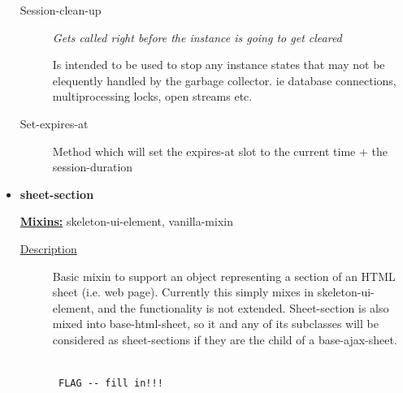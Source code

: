 \documentclass [11pt]{book}
\begin{document}
\begin{itemize}
\begin{description}
\item [Session-clean-up]
\emph{Gets called right before the instance is going to get cleared}

 Is intended to be used to stop any instance states that may not be elequently handled by the garbage collector. ie database connections, multiprocessing locks, open streams etc.




\item [Set-expires-at]

Method which will set the expires-at slot to the current time + the session-duration




\end{description}







\item {}
\label{prim:sheet-section}
\textbf{sheet-section}


\textbf{
\underline{Mixins:}} skeleton-ui-element, vanilla-mixin





\begin{description}

\item [
\underline{Description}]


Basic mixin to support an object 
representing a section of an HTML sheet (i.e. web page). Currently 
this simply mixes in skeleton-ui-element, and the functionality is not 
extended. Sheet-section is also mixed into base-html-sheet, so it and 
any of its subclasses will be considered as sheet-sections if they 
are the child of a base-ajax-sheet.





\end{description}




\begin{figure}
\begin{lrbox}{\boxedverb}
\begin{minipage}{\linewidth}
{\small

\begin{verbatim}

 FLAG -- fill in!!!




\end{verbatim}}
\end{minipage}
\end{lrbox}
\end{figure}
\end{itemize}
\end{document}

